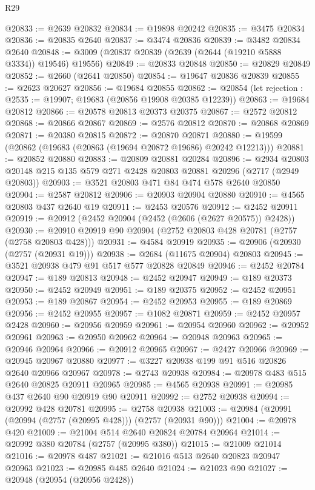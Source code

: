 \begin{lexlean}{R29}
\begin{coremodule}
@20833 := @2639 @20832
@20834 := @19898 @20242
@20835 := @3475 @20834
@20836 := @20835 @2640
@20837 := @3474 @20836
@20839 := @3482 @20834 @2640
@20848 := @3009 (@20837 @20839 (@2639 (@2644 (@19210 @5888 @3334)) @19546) @19556)
@20849 := @20833 @20848
@20850 := @20829 @20849
@20852 := @2660 (@2641 @20850)
@20854 := @19647 @20836 @20839
@20855 := @2623 @20627
@20856 := @19684 @20855
@20862 := @20854 (let rejection : @2535 := @19907; @19683 (@20856 @19908 @20385 @12239))
@20863 := @19684 @20812
@20866 := @20578 @20813 @20373 @20375
@20867 := @2572 @20812
@20868 := @20866 @20867
@20869 := @2576 @20812
@20870 := @20868 @20869
@20871 := @20380 @20815
@20872 := @20870 @20871
@20880 := @19599 (@20862 (@19683 (@20863 (@19694 @20872 @19686) @20242 @12213)))
@20881 := @20852 @20880
@20883 := @20809 @20881 @20284
@20896 := @2934 @20803 @20148 @215 @135 @579 @271 @2428 @20803 @20881 @20296 (@2717 (@2949 @20803))
@20903 := @3521 @20803 @471 @84 @474 @578 @2640 @20850
@20904 := @2587 @20812
@20906 := @20903 @20904 @20880
@20910 := @4565 @20803 @437 @2640 @19
@20911 := @2453 @20576
@20912 := @2452 @20911
@20919 := @20912 (@2452 @20904 (@2452 (@2606 (@2627 @20575)) @2428))
@20930 := @20910 @20919 @90 @20904 (@2752 @20803 @428 @20781 (@2757 (@2758 @20803 @428)))
@20931 := @4584 @20919
@20935 := @20906 (@20930 (@2757 (@20931 @19)))
@20938 := @2684 (@11675 @20904) @20803
@20945 := @3521 @20938 @479 @91 @517 @577 @20828 @20849
@20946 := @2452 @20784
@20947 := @189 @20813
@20948 := @2452 @20947
@20949 := @189 @20373
@20950 := @2452 @20949
@20951 := @189 @20375
@20952 := @2452 @20951
@20953 := @189 @20867
@20954 := @2452 @20953
@20955 := @189 @20869
@20956 := @2452 @20955
@20957 := @1082 @20871
@20959 := @2452 @20957 @2428
@20960 := @20956 @20959
@20961 := @20954 @20960
@20962 := @20952 @20961
@20963 := @20950 @20962
@20964 := @20948 @20963
@20965 := @20946 @20964
@20966 := @20912 @20965
@20967 := @2427 @20966
@20969 := @20945 @20967 @20880
@20977 := @3227 @20938 @199 @91 @516 @20826 @2640 @20966 @20967
@20978 := @2743 @20938
@20984 := @20978 @483 @515 @2640 @20825 @20911 @20965
@20985 := @4565 @20938
@20991 := @20985 @437 @2640 @90 @20919 @90 @20911
@20992 := @2752 @20938
@20994 := @20992 @428 @20781
@20995 := @2758 @20938
@21003 := @20984 (@20991 (@20994 (@2757 (@20995 @428))) (@2757 (@20931 @90)))
@21004 := @20978 @420
@21009 := @21004 @514 @2640 @20824 @20784 @20964
@21014 := @20992 @380 @20784 (@2757 (@20995 @380))
@21015 := @21009 @21014
@21016 := @20978 @487
@21021 := @21016 @513 @2640 @20823 @20947 @20963
@21023 := @20985 @485 @2640
@21024 := @21023 @90
@21027 := @20948 (@20954 (@20956 @2428))

\end{coremodule}
\end{lexlean}

